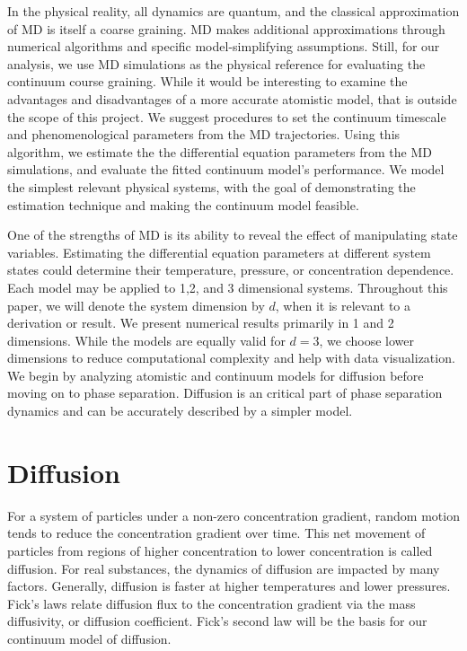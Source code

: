 \documentclass[12pt, reqno]{report}
\theoremstyle{definition}
\theoremstyle{remark}
\begin{document}
In the physical reality, all dynamics are quantum, and the classical approximation of MD is itself a coarse graining.
MD makes additional approximations through numerical algorithms and specific model-simplifying assumptions.
Still, for our analysis, we use MD simulations as the physical reference for evaluating the continuum course graining.
While it would be interesting to examine the advantages and disadvantages of a more accurate atomistic model, that is outside the scope of this project.
We suggest procedures to set the continuum timescale and phenomenological parameters from the MD trajectories.
Using this algorithm, we estimate the the differential equation parameters from the MD simulations, and evaluate the fitted continuum model's performance.
We model the simplest relevant physical systems, with the goal of demonstrating the estimation technique and making the continuum model feasible.

One of the strengths of MD is its ability to reveal the effect of manipulating state variables.
Estimating the differential equation parameters at different system states could determine their temperature, pressure, or concentration dependence. 
Each model may be applied to 1,2, and 3 dimensional systems.
Throughout this paper, we will denote the system dimension by $d$, when it is relevant to a derivation or result.
We present numerical results primarily in 1 and 2 dimensions. 
While the models are equally valid for $d=3$, we choose lower dimensions to reduce computational complexity and help with data visualization.
We begin by analyzing atomistic and continuum models for diffusion before moving on to phase separation.
Diffusion is an critical part of phase separation dynamics and can be accurately described by a simpler model. 

\chapter{Diffusion} \label{chap_intro}

For a system of particles under a non-zero concentration gradient, random motion tends to reduce the concentration gradient over time.
This net movement of particles from regions of higher concentration to lower concentration is called diffusion.
For real substances, the dynamics of diffusion are impacted by many factors. 
Generally, diffusion is faster at higher temperatures and lower pressures.
Fick's laws relate diffusion flux to the concentration gradient via the mass diffusivity, or diffusion coefficient.
Fick's second law will be the basis for our continuum model of diffusion.
\end{document}
